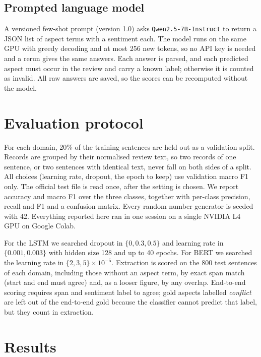 \documentclass{nle}
\begin{document}
\subsection{Prompted language model}

A versioned few-shot prompt (version 1.0) asks \texttt{Qwen2.5-7B-Instruct} to return a JSON list of aspect terms with a sentiment each. The model runs on the same GPU with greedy decoding and at most 256 new tokens, so no API key is needed and a rerun gives the same answers. Each answer is parsed, and each predicted aspect must occur in the review and carry a known label; otherwise it is counted as invalid. All raw answers are saved, so the scores can be recomputed without the model.

\section{Evaluation protocol}

For each domain, 20\% of the training sentences are held out as a validation split. Records are grouped by their normalised review text, so two records of one sentence, or two sentences with identical text, never fall on both sides of a split. All choices (learning rate, dropout, the epoch to keep) use validation macro F1 only. The official test file is read once, after the setting is chosen. We report accuracy and macro F1 over the three classes, together with per-class precision, recall and F1 and a confusion matrix. Every random number generator is seeded with 42. Everything reported here ran in one session on a single NVIDIA L4 GPU on Google Colab.

For the LSTM we searched dropout in $\{0, 0.3, 0.5\}$ and learning rate in $\{0.001, 0.003\}$ with hidden size 128 and up to 40 epochs. For BERT we searched the learning rate in $\{2, 3, 5\}\times10^{-5}$. Extraction is scored on the 800 test sentences of each domain, including those without an aspect term, by exact span match (start and end must agree) and, as a looser figure, by any overlap. End-to-end scoring requires span and sentiment label to agree; gold aspects labelled \textit{conflict} are left out of the end-to-end gold because the classifier cannot predict that label, but they count in extraction.

\section{Results}
\end{document}
